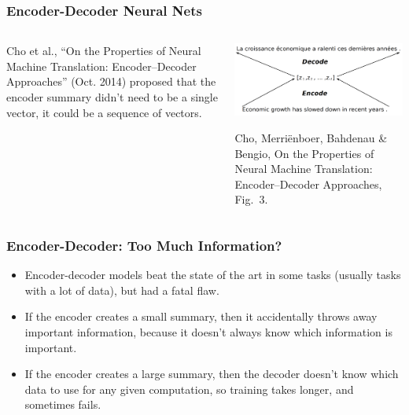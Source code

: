 \documentclass{beamer}
\begin{document}
\begin{frame}
  \frametitle{Encoder-Decoder Neural Nets}
  \begin{columns}
    \begin{column}{0.4\textwidth}
      Cho et al., ``On the Properties of Neural Machine Translation:
      Encoder–Decoder Approaches'' (Oct. 2014) proposed that the
      encoder summary didn't need to be a single vector, it could be a
      sequence of vectors.
    \end{column}
    \begin{column}{0.6\textwidth}
      \begin{center}
        \includegraphics[width=\textwidth]{figs/cho2014oct_fig3.png}

        \begin{tiny}
          Cho, Merri{\"{e}}nboer, Bahdenau \& Bengio, On the
          Properties of Neural Machine Translation: Encoder–Decoder
          Approaches, Fig.~3.
        \end{tiny}
      \end{center}
    \end{column}
  \end{columns}
\end{frame}
  
\begin{frame}
  \frametitle{Encoder-Decoder: Too Much Information?}

  \begin{itemize}
  \item Encoder-decoder models beat the state of the art in some tasks
    (usually tasks with a lot of data), but had a fatal flaw.
  \item If the encoder creates a small summary, then
    it accidentally throws away important information, because it doesn't always
    know which information is important.
  \item If the encoder creates a large summary, then the decoder
    doesn't know which data to use for any given computation, so
    training takes longer, and sometimes fails.
  \end{itemize}
\end{frame}
\end{document}
